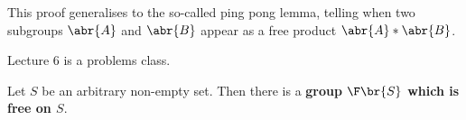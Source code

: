 \begin{remark*}
This proof generalises to the so-called ping pong lemma, telling when two subgroups $ \abr{A} $ and $ \abr{B} $ appear as a free product $ \abr{A} * \abr{B} $.
\end{remark*}


Lecture 6 is a problems class.

\pagebreak


\begin{proposition}
Let $ S $ be an arbitrary non-empty set. Then there is a \textbf{group $ \F\br{S} $ which is free on $ S $}.
\end{proposition}

